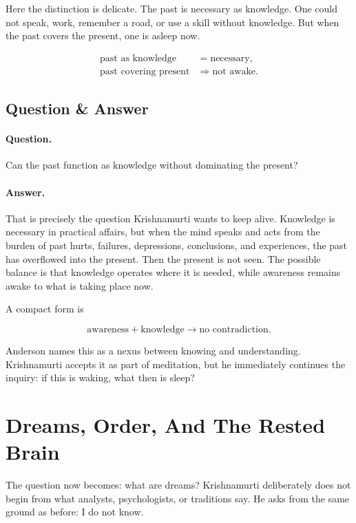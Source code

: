 Here the distinction is delicate. The past is necessary as knowledge. One could not speak, work, remember a road, or use a skill without knowledge. But when the past covers the present, one is asleep now.

\begin{align}
\text{past as knowledge} &= \text{necessary},\\
\text{past covering present} &\Rightarrow \text{not awake}.
\end{align}

\subsection{Question \& Answer}

\paragraph{Question.}
Can the past function as knowledge without dominating the present?

\paragraph{Answer.}
That is precisely the question Krishnamurti wants to keep alive. Knowledge is necessary in practical affairs, but when the mind speaks and acts from the burden of past hurts, failures, depressions, conclusions, and experiences, the past has overflowed into the present. Then the present is not seen. The possible balance is that knowledge operates where it is needed, while awareness remains awake to what is taking place now.

A compact form is

\begin{equation}
\text{awareness} + \text{knowledge}
\longrightarrow
\text{no contradiction}.
\end{equation}

Anderson names this as a nexus between knowing and understanding. Krishnamurti accepts it as part of meditation, but he immediately continues the inquiry: if this is waking, what then is sleep?

\section{Dreams, Order, And The Rested Brain}

The question now becomes: what are dreams? Krishnamurti deliberately does not begin from what analysts, psychologists, or traditions say. He asks from the same ground as before: I do not know.


